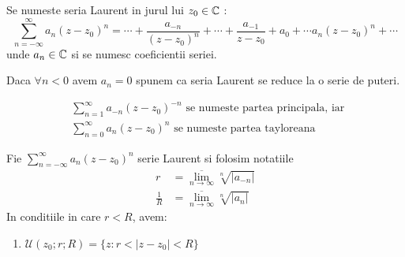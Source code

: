 \begin{definition}
    Se numeste seria Laurent in jurul lui $z_0 \in \mathbb{C}$ :
    \begin{equation}
        \sum_{n=-\infty}^{\infty} a_n(z-z_0)^n =
            \cdots + \frac{a_{-n}}{(z-z_0)^n} + \cdots + \frac{a_{-1}}{z-z_0} + a_0 + \cdots a_n(z-z_0)^n + \cdots
    \end{equation}
    unde $a_n \in \mathbb{C}$ si se numesc coeficientii seriei.

    Daca $\forall n < 0$ avem $a_n = 0$ spunem ca seria Laurent se reduce la o serie de puteri.

    \begin{align*}
        &\sum_{n=1}^{\infty} a_{-n}(z-z_0)^{-n} \text { se numeste partea principala, iar } \\
        &\sum_{n=0}^{\infty} a_n(z-z_0)^n \text { se numeste partea tayloreana}
    \end{align*}
\end{definition}

\begin{theorem}
    Fie $\displaystyle \sum_{n=-\infty}^{\infty} a_n(z-z_0)^n$ serie Laurent si folosim notatiile
    \begin{align*}
        r &= \overline{\lim_{n \to \infty}} \sqrt[n]{|a_{-n}|} \\
        \frac{1}{R} &=\overline{\lim_{n \to \infty}} \sqrt[n]{|a_n|}
    \end{align*}
    In conditiile in care $r<R$, avem:
    \begin{enumerate}
        \item $\mathcal{U}(z_0;r;R) = \{z \colon r < |z-z_0| < R\}$
    \end{enumerate}
\end{theorem}
